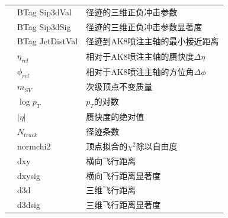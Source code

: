 \begin{table}[htbp]
\begin{tabular}{>{\centering\arraybackslash}p{2.5cm}%
    >{\centering\arraybackslash}p{3cm}%
    >{\centering\arraybackslash}p{9cm}}
    & BTag Sip3dVal & 径迹的三维正负冲击参数\\
    & BTag Sip3dSig & 径迹的三维正负冲击参数显著度\\
    & BTag JetDistVal & 径迹到AK8喷注主轴的最小接近距离\\
    \midrule
    \multirow{11}{*}{次级顶点} & $\eta_{rel}$ & 相对于AK8喷注主轴的赝快度$\Delta \eta$\\
    & $\phi_{rel}$ & 相对于AK8喷注主轴的方位角$\Delta \phi$\\
    & $m_{SV}$ & 次级顶点不变质量\\
    & $\log{p_T}$ & $p_T$的对数\\
    & $|\eta|$ & 赝快度的绝对值\\
    & $N_{track}$ & 径迹条数\\
    & normchi2 & 顶点拟合的$\chi^2$除以自由度\\
    & dxy & 横向飞行距离\\
    & dxysig & 横向飞行距离显著度\\
    & d3d & 三维飞行距离\\
    & d3dsig & 三维飞行距离显著度\\
    \bottomrule\bottomrule
\end{tabular}
\end{table}

